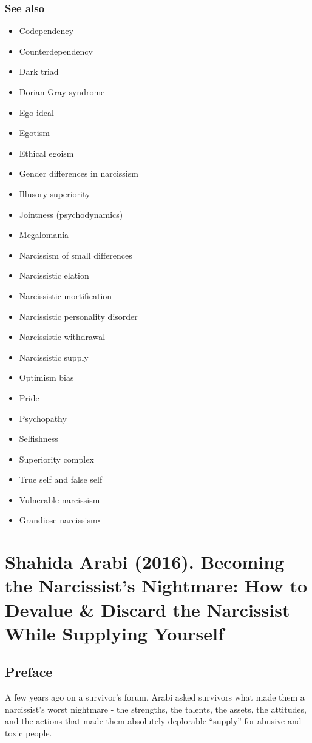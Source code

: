 \documentclass[oneside]{book}
\numberwithin{equation}{section}
\begin{document}
\subsection{See also}
\begin{itemize}
    \item Codependency
    \item Counterdependency
    \item Dark triad
    \item Dorian Gray syndrome
    \item Ego ideal
    \item Egotism
    \item Ethical egoism
    \item Gender differences in narcissism
    \item Illusory superiority
    \item Jointness (psychodynamics)
    \item Megalomania
    \item Narcissism of small differences
    \item Narcissistic elation
    \item Narcissistic mortification
    \item Narcissistic personality disorder
    \item Narcissistic withdrawal
    \item Narcissistic supply
    \item Optimism bias
    \item Pride
    \item Psychopathy
    \item Selfishness
    \item Superiority complex
    \item True self and false self
    \item Vulnerable narcissism
    \item Grandiose narcissism\hfill$\square$
\end{itemize}


\chapter{Shahida Arabi (2016). Becoming the Narcissist's Nightmare: How to Devalue \& Discard the Narcissist While Supplying Yourself}

\section*{Preface}
A few years ago on a survivor's forum, Arabi asked survivors what made them a narcissist's worst nightmare - the strengths, the talents, the assets, the attitudes, and the actions that made them absolutely deplorable ``supply'' for abusive and toxic people.
\end{document}
